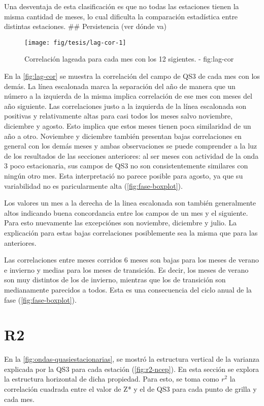 \documentclass[spanish,a4paper]{book}
\begin{document}
Una desventaja de esta clasificación es que no todas las estaciones
tienen la misma cantidad de meses, lo cual dificulta la comparación
estadística entre distintas estaciones. \#\# Persistencia (ver dónde va)

\begin{figure}
\texttt{[image: fig/tesis/lag-cor-1]} \caption{Correlación lageada para cada mes con los 12 sigientes. - fig:lag-cor}\label{fig:lag-cor}
\end{figure}

En la \autoref{fig:lag-cor} se muestra la correlación del campo de QS3
de cada mes con los demás. La línea escalonada marca la separación del
año de manera que un número a la izquierda de la misma implica
correlación de ese mes con meses del año siguiente. Las correlaciones
justo a la izquierda de la línea escalonada son positivas y
relativamente altas para casi todos los meses salvo noviembre, diciembre
y agosto. Esto implica que estos meses tienen poca similaridad de un año
a otro. Noviembre y diciembre también presentan bajas correlaciones en
general con los demás meses y ambas observaciones se puede comprender a
la luz de los resultados de las secciones anteriores: al ser meses con
actividad de la onda 3 poco estacionaria, sus campos de QS3 no son
consistentemente similares con ningún otro mes. Esta interpretació no
parece posible para agosto, ya que su variabilidad no es paricularmente
alta (\autoref{fig:fase-boxplot}).

Los valores un mes a la derecha de la linea escalonada son también
generalmente altos indicando buena concordancia entre los campos de un
mes y el siguiente. Para esto nuevamente las excepciónes son noviembre,
diciembre y julio. La explicación para estas bajas correlaciones
posiblemente sea la misma que para las anteriores.

Las correlaciones entre meses corridos 6 meses son bajas para los meses
de verano e invierno y medias para los meses de transición. Es decir,
los meses de verano son muy distintos de los de invierno, mientras que
los de transición son medianamente parecidos a todos. Esta es una
consecuencia del ciclo anual de la fase (\autoref{fig:fase-boxplot}).

\section{R2}\label{r2}

En la \autoref{fig:ondas-quasiestacionarias}, se mostró la estructura
vertical de la varianza explicada por la QS3 para cada estación
(\autoref{fig:r2-ncep}). En esta sección se explora la estructura
horizontal de dicha propiedad. Para esto, se toma como \(r^2\) la
correlación cuadrada entre el valor de Z* y el de QS3 para cada punto de
grilla y cada mes.
\end{document}
